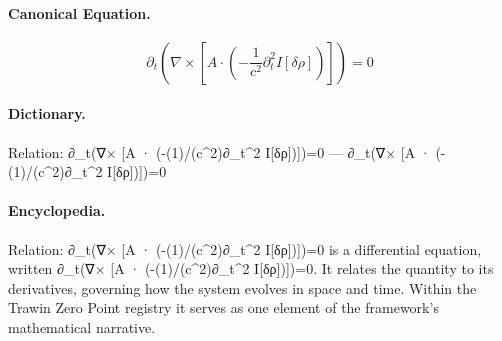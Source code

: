 \paragraph{Canonical Equation.}
\[
\partial_t(\nabla\times [A \cdot (-\frac{1}{c^2}\partial_t^2 I[\delta\rho])])=0
\]

\paragraph{Dictionary.}
Relation: ∂\_t(∇× [A · (-(1)/(c\textasciicircum{}2)∂\_t\textasciicircum{}2 I[δρ])])=0 — ∂\_t(∇× [A · (-(1)/(c\textasciicircum{}2)∂\_t\textasciicircum{}2 I[δρ])])=0

\paragraph{Encyclopedia.}
Relation: ∂\_t(∇× [A · (-(1)/(c\textasciicircum{}2)∂\_t\textasciicircum{}2 I[δρ])])=0 is a differential equation, written ∂\_t(∇× [A · (-(1)/(c\textasciicircum{}2)∂\_t\textasciicircum{}2 I[δρ])])=0. It relates the quantity to its derivatives, governing how the system evolves in space and time. Within the Trawin Zero Point registry it serves as one element of the framework's mathematical narrative.
